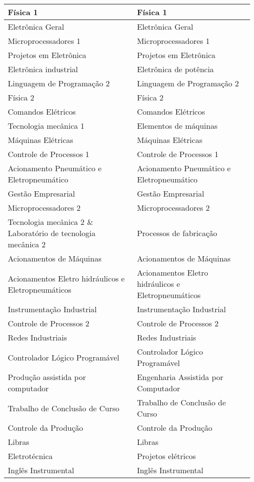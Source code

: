 \begin{quadro}[!h]
{\begin{tabular}{| m{5cm} | m{5cm}|}
\hline
Física 1 & Física 1\\
\hline
Eletrônica Geral & Eletrônica Geral\\
\hline
Microprocessadores 1 & Microprocessadores 1\\
\hline
Projetos em Eletrônica & Projetos em Eletrônica\\
\hline
Eletrônica industrial & Eletrônica de potência\\
\hline
Linguagem de Programação 2 & Linguagem de Programação 2\\
\hline
Física 2 & Física 2\\
\hline
Comandos Elétricos & Comandos Elétricos\\
\hline
Tecnologia mecânica 1 & Elementos de máquinas\\
\hline
Máquinas Elétricas & Máquinas Elétricas\\
\hline
Controle de Processos 1 & Controle de Processos 1\\
\hline
Acionamento Pneumático e Eletropneumático & Acionamento Pneumático e Eletropneumático\\
\hline
Gestão Empresarial & Gestão Empresarial\\
\hline
Microprocessadores 2 & Microprocessadores 2\\
\hline
Tecnologia mecânica 2 \& Laboratório de tecnologia mecânica 2 & Processos de fabricação\\
\hline
Acionamentos de Máquinas & Acionamentos de Máquinas\\
\hline
Acionamentos Eletro hidráulicos e Eletropneumáticos & Acionamentos Eletro hidráulicos e Eletropneumáticos\\
\hline
Instrumentação Industrial & Instrumentação Industrial\\
\hline
Controle de Processos 2 & Controle de Processos 2\\
\hline
Redes Industriais & Redes Industriais\\
\hline
Controlador Lógico Programável & Controlador Lógico Programável\\
\hline
Produção assistida por computador & Engenharia Assistida por Computador\\
\hline
Trabalho de Conclusão de Curso & Trabalho de Conclusão de Curso\\
\hline
Controle da Produção & Controle da Produção\\
\hline
Libras & Libras\\
\hline
Eletrotécnica & Projetos elétricos\\
\hline
Inglês Instrumental & Inglês Instrumental\\
\hline

\end{tabular}
}{
}
\end{quadro}



